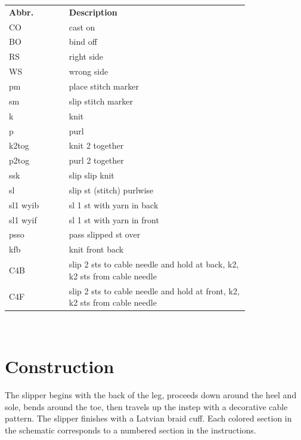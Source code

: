 \documentclass[12pt]{article}
\renewcommand{\arraystretch}{1.5} %
\begin{document}
\begin{multicols}{2}
\vspace{-1em}
\begin{center}
{\renewcommand{\arraystretch}{1.2}
\begin{tabular}{| C{0.2\linewidth}  p{0.6\linewidth} | }
\thickhline {} 
\textbf{Abbr.}	& \textbf{Description} \\ \thickhline
CO 	& cast on \\
BO 	& bind off \\
RS 	& right side \\
WS 	& wrong side \\
pm	& place stitch marker \\
sm	& slip stitch marker \\
k	&  knit \\
p	& purl   \\
k2tog 	& knit 2 together \\
p2tog	& purl 2 together \\
ssk	& slip slip knit \\
sl 	& slip st (stitch) purlwise \\ 
sl1 wyib & sl 1 st with yarn in back \\
sl1 wyif & sl 1 st with yarn in front \\
psso 	& pass slipped st over \\
kfb 	& knit front back \\
C4B 	& slip 2 sts to cable needle and hold at back, k2, k2 sts from cable needle \\
C4F 	& slip 2 sts to cable needle and hold at front, k2, k2 sts from cable needle \\
\hline
\end{tabular}
}
\end{center}

~\\
\vfill
\columnbreak
\section*{Construction}

The slipper begins with the back of the leg, proceeds down around the heel and sole, bends around the toe, then travels up the instep with a decorative cable pattern. The slipper finishes with a Latvian braid cuff. Each colored section in the schematic corresponds to a numbered section in the instructions.


\end{multicols}
\end{document}
